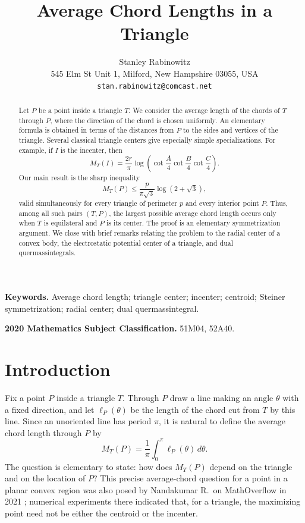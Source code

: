 \documentclass[11pt]{article}
\title{\textbf{Average Chord Lengths in a Triangle}}
\author{Stanley Rabinowitz\\
545 Elm St Unit 1, Milford, New Hampshire 03055, USA\\
\texttt{stan.rabinowitz@comcast.net}}
\date{}
\theoremstyle{remark}
\begin{document}
\maketitle

\begin{abstract}
Let $P$ be a point inside a triangle $T$.  We consider the average
length of the chords of $T$ through $P$, where the direction of the
chord is chosen uniformly.  An elementary formula is obtained in terms
of the distances from $P$ to the sides and vertices of the triangle.
Several classical triangle centers give especially simple
specializations.  For example, if $I$ is the incenter, then
\[
 M_T(I)=\frac{2r}{\pi}
 \log\left(\cot\frac A4\cot\frac B4\cot\frac C4\right).
\]
Our main result is the sharp inequality
\[
 M_T(P)\le
 \frac{p}{\pi\sqrt3}\log(2+\sqrt3),
\]
valid simultaneously for every triangle of perimeter $p$ and every
interior point $P$.  Thus, among all such pairs $(T,P)$, the largest
possible average chord length occurs only when $T$ is equilateral
and $P$ is its center.  The proof is an elementary symmetrization
argument.  We close
with brief remarks relating the problem to the radial center of a
convex body, the electrostatic potential center of a triangle, and
dual quermassintegrals.
\end{abstract}

\medskip
\noindent\textbf{Keywords.} Average chord length; triangle center; incenter;
centroid; Steiner symmetrization; radial center; dual quermassintegral.

\smallskip
\noindent\textbf{2020 Mathematics Subject Classification.}
51M04, 52A40.

\section{Introduction}

Fix a point $P$ inside a triangle $T$.  Through $P$ draw a line making
an angle $\theta$ with a fixed direction, and let $\ell_P(\theta)$ be
the length of the chord cut from $T$ by this line.  Since an unoriented
line has period $\pi$, it is natural to define the average chord
length through $P$ by
\[
 M_T(P)=\frac1\pi\int_0^\pi \ell_P(\theta)\,d\theta.
\]
The question is elementary to state: how does $M_T(P)$ depend on the
triangle and on the location of $P$?  This precise average-chord
question for a point in a planar convex region was also posed by
Nandakumar R.\ on MathOverflow in 2021 \cite{Nandakumar}; numerical
experiments there indicated that, for a triangle, the maximizing
point need not be either the centroid or the incenter.
\end{document}
